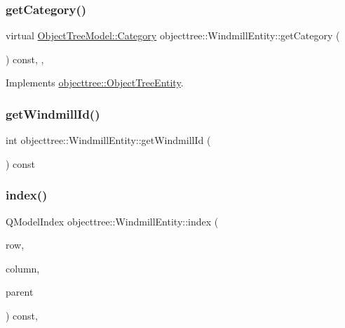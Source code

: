 \mbox{\label{classobjecttree_1_1_windmill_entity_a48c08190b030e2c81fe8f3bf537de809}} 
\subsubsection{\texorpdfstring{getCategory()}{getCategory()}}
{\footnotesize\ttfamily virtual \mbox{\hyperlink{class_object_tree_model_a379e9d6b0d381853785adf62095ba4e3}{Object\+Tree\+Model\+::\+Category}} objecttree\+::\+Windmill\+Entity\+::get\+Category (\begin{DoxyParamCaption}{ }\end{DoxyParamCaption}) const\hspace{0.3cm}{\ttfamily [inline]}, {\ttfamily [override]}, {\ttfamily [virtual]}}



Implements \mbox{\hyperlink{classobjecttree_1_1_object_tree_entity_aa4e80e7fa80672c1b9902add665abc77}{objecttree\+::\+Object\+Tree\+Entity}}.

\mbox{\label{classobjecttree_1_1_windmill_entity_ad6118a7456341410961896a09d074a64}} 
\subsubsection{\texorpdfstring{getWindmillId()}{getWindmillId()}}
{\footnotesize\ttfamily int objecttree\+::\+Windmill\+Entity\+::get\+Windmill\+Id (\begin{DoxyParamCaption}{ }\end{DoxyParamCaption}) const\hspace{0.3cm}{\ttfamily [inline]}}

\mbox{\label{classobjecttree_1_1_windmill_entity_a319b7b2133002caa1c2be248e6711263}} 
\subsubsection{\texorpdfstring{index()}{index()}}
{\footnotesize\ttfamily Q\+Model\+Index objecttree\+::\+Windmill\+Entity\+::index (\begin{DoxyParamCaption}\item[{int}]{row,  }\item[{int}]{column,  }\item[{const Q\+Model\+Index \&}]{parent }\end{DoxyParamCaption}) const\hspace{0.3cm}{\ttfamily [override]}, {\ttfamily [virtual]}}



